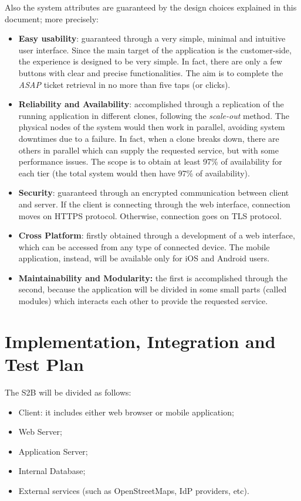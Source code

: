 \documentclass[table, 12pt]{article}
\begin{document}
Also the system attributes are guaranteed by the design choices explained in this document; more precisely:
\begin{itemize}
    \item \textbf{Easy usability}: guaranteed through a very simple, minimal and intuitive user interface. Since the main target of the application is the customer-side, the experience is designed to be very simple. In fact, there are only a few buttons with clear and precise functionalities. The aim is to complete the \textit{ASAP} ticket retrieval in no more than five taps (or clicks).
    \item \textbf{Reliability and Availability}: accomplished through a replication of the running application in different clones, following the \textit{scale-out} method. The physical nodes of the system would then work in parallel, avoiding system downtimes due to a failure. In fact, when a clone breaks down, there are others in parallel which can supply the requested service, but with some performance issues. The scope is to obtain at least 97\% of availability for each tier (the total system would then have 97\% of availability).
    \item \textbf{Security}: guaranteed through an encrypted communication between client and server. If the client is connecting through the web interface, connection moves on HTTPS protocol. Otherwise, connection goes on TLS protocol.
    \item \textbf{Cross Platform}: firstly obtained through a development of a web interface, which can be accessed from any type of connected device. The mobile application, instead, will be available only for iOS and Android users.
    \item \textbf{Maintainability and Modularity:} the first is accomplished through the second, because the application will be divided in some small parts (called modules) which interacts each other to provide the requested service.
\end{itemize}

\section{Implementation, Integration and Test Plan}
The S2B will be divided as follows:
\begin{itemize}
    \item Client: it includes either web browser or mobile application;
    \item Web Server;
    \item Application Server;
    \item Internal Database;
    \item External services (such as OpenStreetMaps, IdP providers, etc).
\end{itemize}
\end{document}

